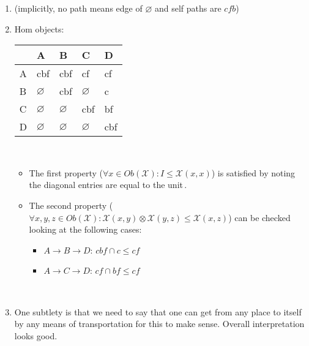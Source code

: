 \begin{enumerate}
    \item {} (implicitly, no path means edge of $\varnothing$ and self paths are $cfb$)
    \item Hom objects:\,

          \begin{minipage}{0.48\textwidth}
            \begin{tabular}{|l|l|l|l|l|}
              \hline
                & A             & B             & C             & D   \\ \hline
              A & cbf           & cbf           & cf            & cf  \\ \hline
              B & $\varnothing$ & cbf           & $\varnothing$ & c   \\  \hline
              C & $\varnothing$ & $\varnothing$ & cbf           & bf  \\  \hline
              D & $\varnothing$ & $\varnothing$ & $\varnothing$ & cbf \\ \hline
            \end{tabular}
          \end{minipage}\,

          \begin{itemize}
            \item   The first property ($\forall x \in Ob(\mathcal{X}): I \leq \mathcal{X}(x,x)$) is satisfied by noting \,the diagonal entries are equal to the unit\,.
            \item The second property ($\forall x,y,z \in Ob(\mathcal{X}): \mathcal{X}(x,y)\otimes\mathcal{X}(y,z) \leq \mathcal{X}(x,z)$) can be checked looking at the following cases:\,
                  \begin{itemize}
                    \item $A \rightarrow B \rightarrow D$: $cbf \cap c \leq cf$
                    \item $A \rightarrow C \rightarrow D$: $cf \cap bf \leq cf$
                  \end{itemize}\,

          \end{itemize}
    \item One subtlety is that we need to say that one can get from any place to itself by any means of transportation for this to make sense. Overall interpretation looks good.
  \end{enumerate}
